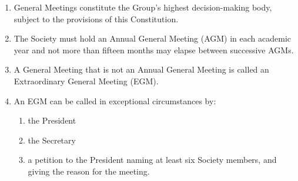 \documentclass[12pt]{constitution}
\begin{document}

\label{article:general-meetings}

\begin{enumerate}
    \item General Meetings constitute the Group's highest decision-making body, subject to the provisions of this Constitution.
    \item The Society must hold an Annual General Meeting (AGM) in each academic year and not more than fifteen months may elapse between successive AGMs.
    \item A General Meeting that is not an Annual General Meeting is called an Extraordinary General Meeting (EGM).
    \item An EGM can be called in exceptional circumstances by:
    \begin{enumerate}
        \item the President
        \item the Secretary
        \item a petition to the President naming at least six Society members, and giving the reason for the meeting.
    \end{enumerate}
\end{enumerate}


\label{article:proceedings-general-meetings}
\end{document}
